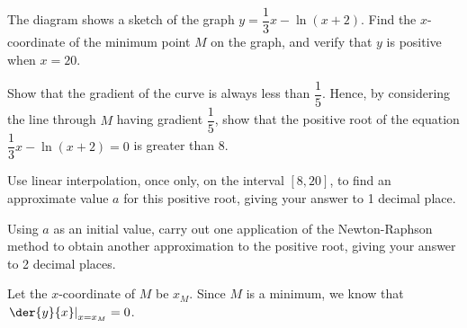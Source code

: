 \documentclass{jhwhw}
\begin{document}
    \problem{}
        \begin{center}
        \end{center}

        The diagram shows a sketch of the graph $y = \dfrac13 x - \ln (x+2)$. Find the $x$-coordinate of the minimum point $M$ on the graph, and verify that $y$ is positive when $x = 20$.

        Show that the gradient of the curve is always less than $\dfrac15$. Hence, by considering the line through $M$ having gradient $\dfrac15$, show that the positive root of the equation $\dfrac13 x - \ln (x+2) = 0$ is greater than 8.

        Use linear interpolation, once only, on the interval $[8, 20]$, to find an approximate value $a$ for this positive root, giving your answer to 1 decimal place.

        Using $a$ as an initial value, carry out one application of the Newton-Raphson method to obtain another approximation to the positive root, giving your answer to 2 decimal places.

    \solution
        Let the $x$-coordinate of $M$ be $x_M$. Since $M$ is a minimum, we know that $\left. \der{y}{x} \right|_{x = x_M} = 0$.
        
\end{document}
